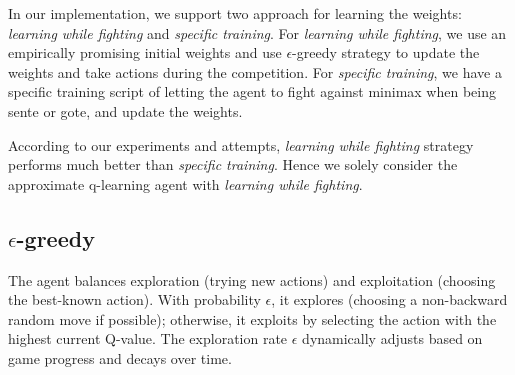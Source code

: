 In our implementation, we support two approach for learning the weights: \textit{learning while fighting} and \textit{specific training}. For \textit{learning while fighting}, we use an empirically promising initial weights and use $\epsilon$-greedy strategy to update the weights and take actions during the competition. For \textit{specific training}, we have a specific training script of letting the agent to fight against minimax when being sente or gote, and update the weights.

According to our experiments and attempts, \textit{learning while fighting} strategy performs much better than \textit{specific training}. Hence we solely consider the approximate q-learning agent with \textit{learning while fighting}.

\subsection{$\epsilon$-greedy}
The agent balances exploration (trying new actions) and exploitation (choosing the best-known action). With probability $\epsilon$, it explores (choosing a non-backward random move if possible); otherwise, it exploits by selecting the action with the highest current Q-value. The exploration rate $\epsilon$ dynamically adjusts based on game progress and decays over time.
